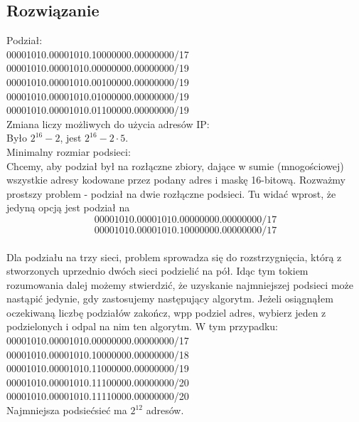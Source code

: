 \documentclass[a4paper]{article}
\begin{document}
\subsection{Rozwiązanie}
Podział:\\
00001010.00001010.10000000.00000000/17\\
00001010.00001010.00000000.00000000/19\\
00001010.00001010.00100000.00000000/19\\
00001010.00001010.01000000.00000000/19\\
00001010.00001010.01100000.00000000/19\\

Zmiana liczy możliwych do użycia adresów IP:\\
Było $2^{16}-2$, jest $2^{16}-2\cdot5$.\\

Minimalny rozmiar podsieci:\\
Chcemy, aby podział był na rozłączne zbiory, dające w sumie (mnogościowej) wszystkie adresy kodowane przez podany adres i maskę 16-bitową. Rozważmy prostszy problem - podział na dwie rozłączne podsieci. Tu widać wprost, że jedyną opcją jest podział na $$00001010.00001010.00000000.00000000/17$$ $$00001010.00001010.10000000.00000000/17$$\\
Dla podziału na trzy sieci, problem sprowadza się do rozstrzygnięcia, którą z stworzonych uprzednio dwóch sieci podzielić na pół. Idąc tym tokiem rozumowania dalej możemy stwierdzić, że uzyskanie najmniejszej podsieci może nastąpić jedynie, gdy zastosujemy następujący algorytm. Jeżeli osiągnąłem oczekiwaną liczbę podziałów zakończ, wpp podziel adres, wybierz jeden z podzielonych i odpal na nim ten algorytm. W tym przypadku:\\


00001010.00001010.00000000.00000000/17\\
00001010.00001010.10000000.00000000/18\\
00001010.00001010.11000000.00000000/19\\
00001010.00001010.11100000.00000000/20\\
00001010.00001010.11110000.00000000/20\\

Najmniejsza podsiećsieć ma $2^{12}$ adresów.

\end{document}
